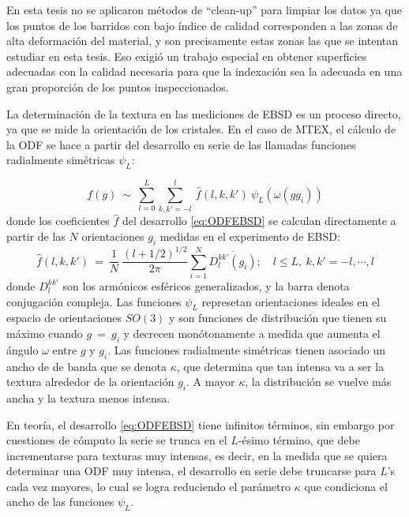 En esta tesis no se aplicaron métodos de “clean-up” para limpiar los datos ya que los puntos de los barridos con bajo índice de calidad corresponden a las zonas de alta deformación del material, y son precisamente estas zonas las que se intentan estudiar en esta tesis. 
Eso exigió un trabajo especial en obtener superficies adecuadas con la calidad necesaria para que la indexación sea la adecuada en una gran proporción de los puntos inspeccionados.

La determinación de la textura en las mediciones de EBSD es un proceso directo, ya que se mide la orientación de los cristales.
En el caso de MTEX, el cálculo de la ODF se hace a partir del desarrollo en serie de las llamadas funciones radialmente simétricas $\psi_L$:

\begin{equation}
  f(g) \ \sim \ \sum_{l=0}^{L} \sum_{k,k'=-l}^{l} \ \hat{f}(l, k, k') \ \psi_L(\omega(gg_i)) 
  \label{eq:ODFEBSD}
\end{equation}
\noindent
donde los coeficientes $\hat{f}$ del desarrollo \ref{eq:ODFEBSD} se calculan directamente a partir de las $N$ orientaciones $g_i$ medidas en el experimento de EBSD:
\begin{equation}
  \hat{f}(l, k, k') \ = \ \frac{1}{N} \ \frac{(l + 1/2)^{1/2}}{2 \pi} \sum_{i=1}^{N} \overline{D_l^{k k'} (g_i)}; \quad l \leq L, \ k, k' = -l, \cdots, l
  \label{eq:ODFcoef}
\end{equation}
\noindent
donde $D_l^{k k'}$ son los armónicos esféricos generalizados, y la barra denota conjugación compleja. Las funciones $\psi_L$ represetan orientaciones ideales en el espacio de orientaciones $SO(3)$ y son funciones de distribución que tienen su máximo cuando $g \ = \ g_i$ y decrecen monótonamente a medida que aumenta el ángulo $\omega$ entre $g$ y $g_i$.
Las funciones radialmente simétricas tienen asociado un ancho de de banda que se denota $\kappa$, que determina que tan intensa va a ser la textura alrededor de la orientación $g_i$.
A mayor $\kappa$, la distribución se vuelve más ancha y la textura menos intensa.

En teoría, el desarrollo \ref{eq:ODFEBSD} tiene infinitos términos, sin embargo por cuestiones de cómputo la serie se trunca en el $L$-ésimo término, que debe incrementarse para texturas muy intensas, es decir, en la medida que se quiera determinar una ODF muy intensa, el desarrollo en serie debe truncarse para $L$'s cada vez mayores, lo cual se logra reduciendo el parámetro $\kappa$ que condiciona el ancho de las funciones $\psi_L$.

